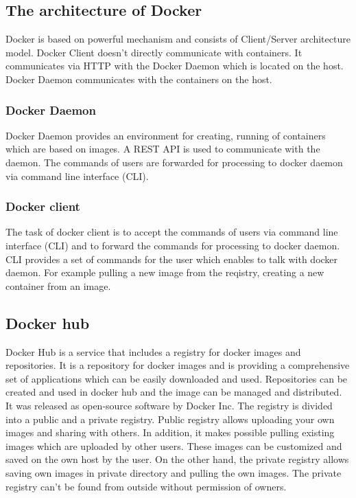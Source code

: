 \subsection{The architecture of Docker}
Docker is based on powerful mechanism and consists of Client/Server architecture model. Docker Client doesn’t directly communicate with containers. It communicates via HTTP with the Docker Daemon which is located on the host. Docker Daemon communicates with the containers on the host.

\subsubsection{Docker Daemon}

Docker Daemon provides an environment for creating, running of containers which are based on images. A REST API is used to communicate with the daemon. The commands of users are forwarded for processing to docker daemon via command line interface (CLI). 


\subsubsection{Docker client}

The task of docker client is to accept the commands of users via command line interface (CLI) and to forward the commands for processing to docker daemon. CLI provides a set of commands for the user which enables to talk with docker daemon. For example pulling a new image from the reqistry, creating a new container from an image.


\subsection{Docker hub}
Docker Hub is a service that includes a registry for docker images and repositories. It is a repository for docker images and is providing a comprehensive set of applications which can be easily downloaded and used. Repositories can be created and used in docker hub and the image can be managed and distributed. It was released as open-source software by Docker Inc. The registry is divided into a public and a private registry. Public registry allows uploading your own images and sharing with others. In addition, it makes possible pulling existing images which are uploaded by other users. These images can be customized and saved on the own host by the user. On the other hand, the private registry allows saving own images in private directory and pulling the own images. The private registry can’t be found from outside without permission of owners.

